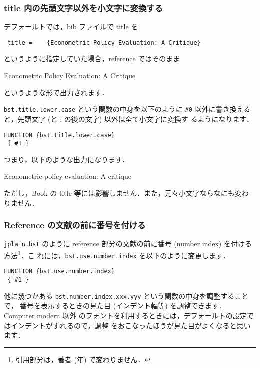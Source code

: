 \documentclass[a4j,10pt]{jarticle}
\begin{document}
\subsubsection{title 内の先頭文字以外を小文字に変換する}

デフォールトでは，bib ファイルで title を
\begin{center}
  \verb| title =	{Econometric Policy Evaluation: A Critique}|
\end{center}
というように指定していた場合，reference ではそのまま
\begin{center}
 Econometric Policy Evaluation: A Critique
\end{center}
というような形で出力されます．

\texttt{bst.title.lower.case} という関数の中身を以下のように \verb|#0| 
以外に書き換えると，先頭文字 (と : の後の文字) 以外は全て小文字に変換す
るようになります．
\begin{screen}
\begin{verbatim}
FUNCTION {bst.title.lower.case}
 { #1 }
\end{verbatim}
\end{screen}

つまり，以下のような出力になります．
\begin{center}
 Econometric policy evaluation: A critique
\end{center}

ただし，Book の title 等には影響しません．また，元々小文字ならなにも変わ
りません．

\subsubsection{Reference の文献の前に番号を付ける}

\texttt{jplain.bst} のように reference 部分の文献の前に番号 (number
index) を付ける方法\footnote{引用部分は，著者 (年) で変わりません．}．こ
れには，\texttt{bst.use.number.index} を以下のように変更します．
\begin{screen}
\begin{verbatim}
FUNCTION {bst.use.number.index}
 { #1 }
\end{verbatim}
\end{screen}

他に幾つかある \texttt{bst.number.index.xxx.yyy} という関数の中身を調整することで，
番号を表示するときの見た目 (インデント幅等) を調整できます．Computer modern 以外
のフォントを利用するときには，デフォールトの設定ではインデントがずれるので，調整
をおこなったほうが見た目がよくなると思います．
\end{document}
